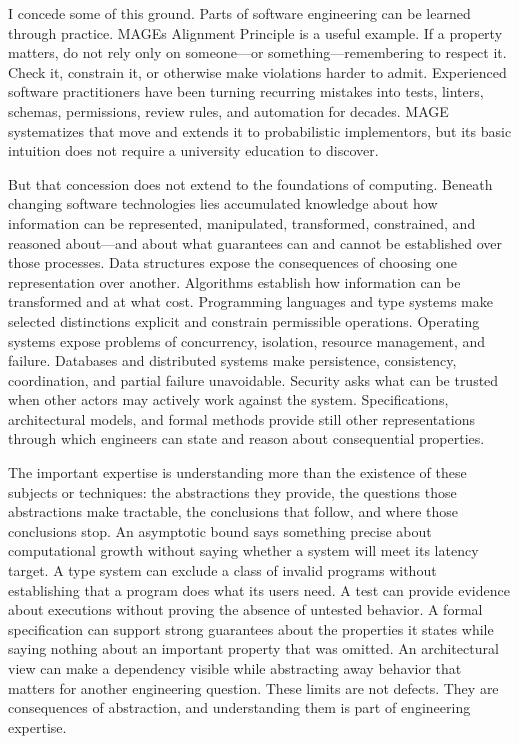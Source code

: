 
I concede some of this ground. Parts of software engineering can be learned through practice. MAGE\textquotesingle s Alignment Principle is a useful example. If a property matters, do not rely only on someone---or something---remembering to respect it. Check it, constrain it, or otherwise make violations harder to admit. Experienced software practitioners have been turning recurring mistakes into tests, linters, schemas, permissions, review rules, and automation for decades. MAGE systematizes that move and extends it to probabilistic implementors, but its basic intuition does not require a university education to discover.


But that concession does not extend to the foundations of computing. Beneath changing software technologies lies accumulated knowledge about how information can be represented, manipulated, transformed, constrained, and reasoned about---and about what guarantees can and cannot be established over those processes. Data structures expose the consequences of choosing one representation over another. Algorithms establish how information can be transformed and at what cost. Programming languages and type systems make selected distinctions explicit and constrain permissible operations. Operating systems expose problems of concurrency, isolation, resource management, and failure. Databases and distributed systems make persistence, consistency, coordination, and partial failure unavoidable. Security asks what can be trusted when other actors may actively work against the system. Specifications, architectural models, and formal methods provide still other representations through which engineers can state and reason about consequential properties.


The important expertise is understanding more than the existence of these subjects or techniques: the abstractions they provide, the questions those abstractions make tractable, the conclusions that follow, and where those conclusions stop. An asymptotic bound says something precise about computational growth without saying whether a system will meet its latency target. A type system can exclude a class of invalid programs without establishing that a program does what its users need. A test can provide evidence about executions without proving the absence of untested behavior. A formal specification can support strong guarantees about the properties it states while saying nothing about an important property that was omitted. An architectural view can make a dependency visible while abstracting away behavior that matters for another engineering question. These limits are not defects. They are consequences of abstraction, and understanding them is part of engineering expertise.

